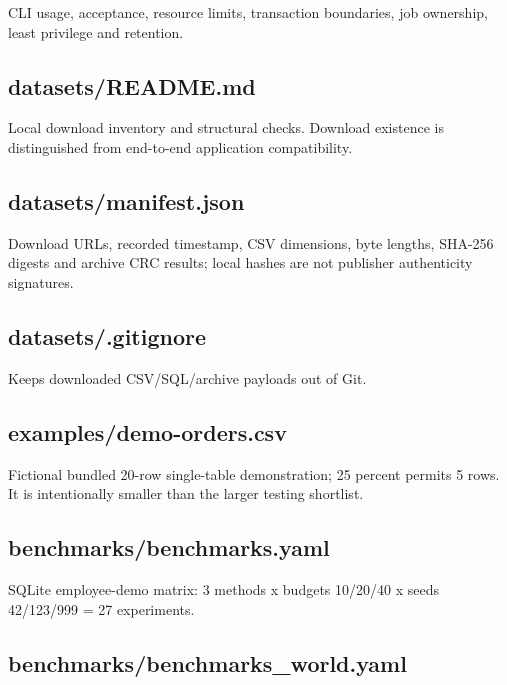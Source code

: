 CLI usage, acceptance, resource limits, transaction boundaries, job ownership, least privilege and retention.


\subsection*{datasets/README.md}

Local download inventory and structural checks. Download existence is distinguished from end-to-end application compatibility.


\subsection*{datasets/manifest.json}

Download URLs, recorded timestamp, CSV dimensions, byte lengths, SHA-256 digests and archive CRC results; local hashes are not publisher authenticity signatures.


\subsection*{datasets/.gitignore}

Keeps downloaded CSV/SQL/archive payloads out of Git.


\subsection*{examples/demo-orders.csv}

Fictional bundled 20-row single-table demonstration; 25 percent permits 5 rows. It is intentionally smaller than the larger testing shortlist.


\subsection*{benchmarks/benchmarks.yaml}

SQLite employee-demo matrix: 3 methods x budgets 10/20/40 x seeds 42/123/999 = 27 experiments.


\subsection*{benchmarks/benchmarks\_world.yaml}

